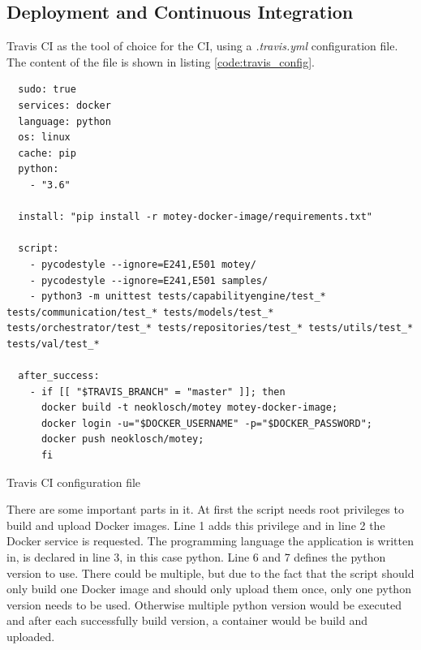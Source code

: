 \subsection{Deployment and Continuous Integration}
Travis CI as the tool of choice for the \ac{CI}, using a \textit{.travis.yml} configuration file.
The content of the file is shown in listing \ref{code:travis_config}.\newline

\begin{listing}[H]
  \begin{verbatim}
  sudo: true
  services: docker
  language: python
  os: linux
  cache: pip
  python:
    - "3.6"

  install: "pip install -r motey-docker-image/requirements.txt"

  script:
    - pycodestyle --ignore=E241,E501 motey/
    - pycodestyle --ignore=E241,E501 samples/
    - python3 -m unittest tests/capabilityengine/test_* tests/communication/test_* tests/models/test_* tests/orchestrator/test_* tests/repositories/test_* tests/utils/test_* tests/val/test_*

  after_success:
    - if [[ "$TRAVIS_BRANCH" = "master" ]]; then
      docker build -t neoklosch/motey motey-docker-image;
      docker login -u="$DOCKER_USERNAME" -p="$DOCKER_PASSWORD";
      docker push neoklosch/motey;
      fi
  \end{verbatim}
  \caption{Travis CI configuration file}
  \label{code:travis_config}
\end{listing}

There are some important parts in it.
At first the script needs root privileges to build and upload Docker images.
Line 1 adds this privilege and in line 2 the Docker service is requested.
The programming language the application is written in, is declared in line 3, in this case python.
Line 6 and 7 defines the python version to use.
There could be multiple, but due to the fact that the script should only build one Docker image and should only upload them once, only one python version needs to be used.
Otherwise multiple python version would be executed and after each successfully build version, a container would be build and uploaded.\newline


